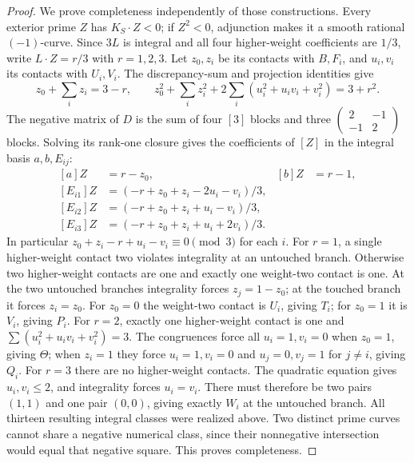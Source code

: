 \documentclass[11pt,reqno]{amsart}
\theoremstyle{definition}
\theoremstyle{remark}
\numberwithin{equation}{section}
\begin{document}
\begin{proof}
We prove completeness independently of those constructions.
Every exterior prime $Z$ has $K_S\cdot Z<0$; if $Z^2<0$, adjunction
makes it a smooth rational $(-1)$-curve.
Since $3L$ is integral and all four higher-weight coefficients are $1/3$,
write $L\cdot Z=r/3$ with $r=1,2,3$.
Let $z_0,z_i$ be its contacts with $B,F_i$, and $u_i,v_i$ its contacts
with $U_i,V_i$. The discrepancy-sum and projection identities give
\[
 z_0+\sum_i z_i=3-r,
 \qquad z_0^2+\sum_i z_i^2
       +2\sum_i(u_i^2+u_iv_i+v_i^2)=3+r^2.
\]
The negative matrix of $D$ is the sum of four $[3]$ blocks and three
$\left(\begin{smallmatrix}2&-1\\-1&2\end{smallmatrix}\right)$ blocks.
Solving its rank-one closure gives the coefficients of $[Z]$ in the
integral basis $a,b,E_{ij}$:
\[
\begin{aligned}
 [a]Z&=r-z_0,&[b]Z&=r-1,\\
 [E_{i1}]Z&=(-r+z_0+z_i-2u_i-v_i)/3,\\
 [E_{i2}]Z&=(-r+z_0+z_i+u_i-v_i)/3,\\
 [E_{i3}]Z&=(-r+z_0+z_i+u_i+2v_i)/3.
\end{aligned}
\]
In particular $z_0+z_i-r+u_i-v_i\equiv0\pmod3$ for each $i$.
For $r=1$, a single higher-weight contact two violates integrality at
an untouched branch. Otherwise two higher-weight contacts are one and
exactly one weight-two contact is one. At the two untouched branches
integrality forces $z_j=1-z_0$; at the touched branch it forces
$z_i=z_0$. For $z_0=0$ the weight-two contact is $U_i$, giving $T_i$;
for $z_0=1$ it is $V_i$, giving $P_i$.
For $r=2$, exactly one higher-weight contact is one and
$\sum(u_i^2+u_iv_i+v_i^2)=3$.
The congruences force all $u_i=1,v_i=0$ when $z_0=1$, giving $\Theta$;
when $z_i=1$ they force $u_i=1,v_i=0$ and $u_j=0,v_j=1$ for $j\ne i$,
giving $Q_i$.
For $r=3$ there are no higher-weight contacts. The quadratic equation gives
$u_i,v_i\le2$, and integrality forces $u_i=v_i$.
There must therefore be two pairs $(1,1)$ and one pair
$(0,0)$, giving exactly $W_i$ at the untouched branch.
All thirteen resulting integral classes were realized above.
Two distinct prime curves cannot share a negative numerical class,
since their nonnegative intersection would equal that negative square.
This proves completeness.
\end{proof}
\end{document}
